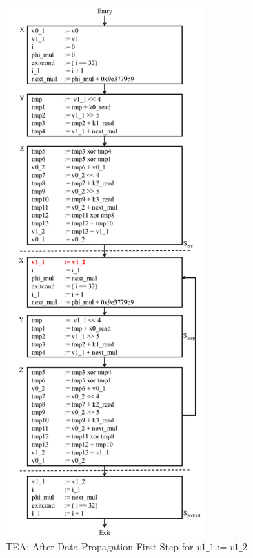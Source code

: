 \begin{figure}[H]
\begin{center}
\includegraphics[height=8in]{fig-proposal/tea-after-data-propagation3}
\caption{TEA: After Data Propagation First Step for $v1\_1 := v1\_2$}
\label{fig:tea-after-data-propagation3}
\end{center}
\end{figure}

